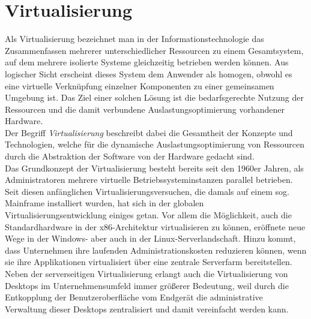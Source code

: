 \chapter{Virtualisierung}\label{chap:Virt}
Als Virtualisierung bezeichnet man in der Informationstechnologie das Zusammenfassen mehrerer unterschiedlicher Ressourcen zu einem Gesamtsystem, auf dem mehrere isolierte Systeme gleichzeitig betrieben werden können. Aus logischer Sicht erscheint dieses System dem Anwender als homogen, obwohl es eine virtuelle Verknüpfung einzelner Komponenten zu einer gemeinsamen Umgebung ist. Das Ziel einer solchen Lösung ist die bedarfsgerechte Nutzung der Ressourcen und die damit verbundene Auslastungsoptimierung vorhandener Hardware.~\cite[S.~411]{Bengel2015}\medskip\\
Der Begriff \textit{Virtualisierung} beschreibt dabei die Gesamtheit der Konzepte und Technologien, welche für die dynamische Auslastungsoptimierung von Ressourcen durch die Abstraktion der Software von der Hardware gedacht sind. \cite[S.~253]{Baun2020}\medskip\\
Das Grundkonzept der Virtualisierung besteht bereits seit den 1960er Jahren, als Administratoren mehrere virtuelle Betriebssysteminstanzen parallel betrieben. Seit diesen anfänglichen Virtualisierungsversuchen, die damals auf einem sog. Mainframe installiert wurden, hat sich in der globalen Virtualisierungsentwicklung einiges getan. Vor allem die Möglichkeit, auch die Standardhardware in der x86-Architektur virtualisieren zu können, eröffnete neue Wege in der Windows- aber auch in der Linux-Serverlandschaft. Hinzu kommt, dass Unternehmen ihre laufenden Administrationskosten reduzieren können, wenn sie ihre Applikationen virtualisiert über eine zentrale Serverfarm bereitstellen. Neben der serverseitigen Virtualisierung erlangt auch die Virtualisierung von Desktops im Unternehmensumfeld immer größerer Bedeutung, weil durch die Entkopplung der Benutzeroberfläche vom Endgerät die administrative Verwaltung dieser Desktops zentralisiert und damit vereinfacht werden kann.
\cite[S.~72]{2010}
